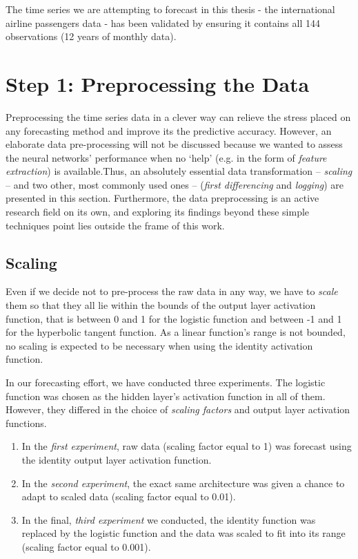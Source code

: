 The time series we are attempting to forecast in this thesis - the international airline passengers data - has been validated by ensuring it contains all 144 observations (12 years of monthly data).

\section{Step 1: Preprocessing the Data}

Preprocessing the time series data in a clever way can relieve the stress placed on any forecasting method and improve its the predictive accuracy. However, an elaborate data pre-processing will not be discussed because we wanted to assess the neural networks' performance when no `help' (e.g. in the form of \textit{feature extraction}) is available.Thus, an absolutely essential data transformation -- \textit{scaling} -- and two other, most commonly used ones -- (\textit{first differencing} and \textit{logging}) are presented in this section. Furthermore, the data preprocessing is an active research field on its own, and exploring its findings beyond these simple techniques point lies outside the frame of this work.

\subsection{Scaling}

Even if we decide not to pre-process the raw data in any way, we have to \textit{scale} them so that they all lie within the bounds of the output layer activation function, that is between 0 and 1 for the logistic function and between -1 and 1 for the hyperbolic tangent function. As a linear function's range is not bounded, no scaling is expected to be necessary when using the identity activation function. 

In our forecasting effort, we have conducted three experiments. The logistic function was chosen as the hidden layer's activation function in all of them. However, they differed in the choice of \textit{scaling factors} and output layer activation functions.
\begin{enumerate}
\item In the \textit{first experiment}, raw data (scaling factor equal to 1) was forecast using the identity output layer activation function.
\item In the \textit{second experiment}, the exact same architecture was given a chance to adapt to scaled data (scaling factor equal to 0.01).
\item In the final, \textit{third experiment} we conducted, the identity function was replaced by the logistic function and the data was scaled to fit into its range (scaling factor equal to 0.001).
\end{enumerate}

